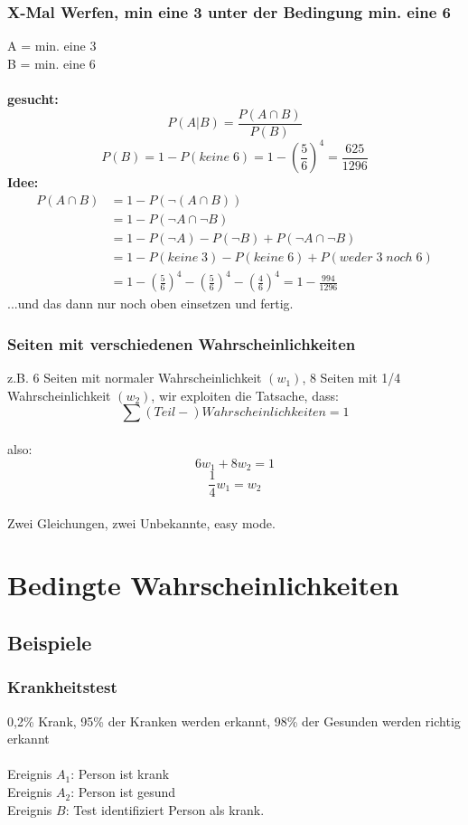 \documentclass{article}
\begin{document}
	\subsubsection{X-Mal Werfen, min eine 3 unter der Bedingung min. eine 6}
	A = min. eine 3 \\
	B = min. eine 6 \\\\
	\textbf{gesucht:} \[P(A|B) = \frac{P(A\cap B)}{P(B)} \]
	\[P(B) = 1-P(keine\;6) = 1-\left(\frac{5}{6}\right)^4 = \frac{625}{1296}\]
	\textbf{Idee:}
	\begin{align*}
	P(A\cap B) 	&= 1-P(\neg (A\cap B))\\
	&= 1-P(\neg A \cap \neg B)\\
	&= 1-P(\neg A) - P(\neg B) + P(\neg A \cap \neg B)\\
	&= 1-P(keine\;3)-P(keine\;6)+P(weder\;3\;noch\;6)\\
	&= 1-\left( \frac{5}{6}\right)^4-\left( \frac{5}{6}\right)^4-\left( \frac{4}{6}\right)^4 = 1- \frac{994}{1296}
	\end{align*}	
	...und das dann nur noch oben einsetzen und fertig.
	
	\subsubsection{Seiten mit verschiedenen Wahrscheinlichkeiten}
	z.B. 6 Seiten mit normaler Wahrscheinlichkeit $(w_1)$, 8 Seiten mit 1/4 Wahrscheinlichkeit
	$(w_2)$, wir exploiten die Tatsache, dass: \\ \[ \sum
	(Teil-)Wahrscheinlichkeiten = 1 \]\\
	also:\\
	\begin{equation}	
	6w_1 + 8w_2 = 1 \end{equation}
	\begin{equation}	
	\frac{1}{4}w_1 = w_2 
	\end{equation}\\
	Zwei Gleichungen, zwei Unbekannte, easy mode.
	
	\section{Bedingte Wahrscheinlichkeiten}
	\subsection{Beispiele}
	\subsubsection{Krankheitstest}
	0,2\% Krank, 95\% der Kranken werden erkannt, 98\% der Gesunden werden richtig erkannt\\ \\
	Ereignis $A_1$: Person ist krank\\
	Ereignis $A_2$: Person ist gesund\\
	Ereignis $B$: Test identifiziert Person als krank.\\
	
\end{document}
